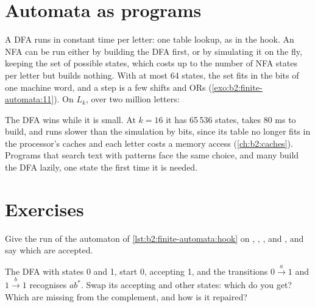 \section{Automata as programs}\label{sec:b2:finite-automata:programs}

A DFA runs in constant time per letter: one table lookup, as in the hook. An NFA can be run either by building the
DFA first, or by simulating it on the fly, keeping the set of possible states, which costs up to the number of NFA
states per letter but builds nothing. With at most 64 states, the set fits in the bits of one machine word, and
a step is a few shifts and ORs (\cref{exo:b2:finite-automata:11}). On $L_k$, over two million letters:

\label{out:b2:finite-automata:measured}

The DFA wins while it is small. At $k = 16$ it has 65\,536 states, takes 80 ms to build, and runs slower than the
simulation by bits, since its table no longer fits in the processor's caches and each letter costs a memory access
(\cref{ch:b2:caches}). Programs that search text with patterns face the same choice, and many build the DFA lazily,
one state the first time it is needed.

\section{Exercises}\label{sec:b2:finite-automata:exercises}

\begin{exercise}[$\star$]\label{exo:b2:finite-automata:1}
Give the run of the automaton of \cref{lst:b2:finite-automata:hook} on , , ,
 and \code{+}, and say which are accepted.
\end{exercise}

\begin{exercise}[$\star$]\label{exo:b2:finite-automata:2}
The DFA with states 0 and 1, start 0, accepting 1, and the transitions $0 \xrightarrow{a} 1$ and $1 \xrightarrow{b}
1$ recognises $ab^*$. Swap its accepting and other states: which  do you get? Which  are missing from
the complement, and how is it repaired?
\end{exercise}

